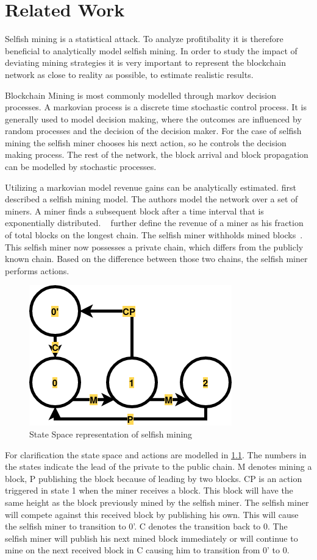 \chapter{Related Work}\label{chap:relatedwork}

Selfish mining is a statistical attack. To analyze profitibality it is therefore beneficial to analytically model selfish mining. In order to study the impact of deviating mining strategies it is very important to represent the blockchain network as close to reality as possible, to estimate realistic results.

Blockchain Mining is most commonly modelled through markov decision processes.
A markovian process is a discrete time stochastic control process. It is generally used to model decision making, where the outcomes are influenced by random processes and the decision of the decision maker.
For the case of selfish mining the selfish miner chooses his next action, so he controls the decision making process. The rest of the network, the block arrival and block propagation can be modelled by stochastic processes. 

Utilizing a markovian model revenue gains can be analytically estimated. \citeauthor{eyal} first described a selfish mining model.
The authors model the network over a set of miners. A miner finds a subsequent block after a time interval that is exponentially distributed. ~\citeauthor{eyal} further define the revenue of a miner as his fraction of total blocks on the longest chain.
The selfish miner withholds mined blocks~\cite{eyal}. This selfish miner now possesses a private chain, which differs from the publicly known chain. Based on the difference between those two chains, the selfish miner performs actions. 
\begin{figure}
\centering
\includegraphics[width=.5\linewidth]{figures/eyal_states.png}
\caption{State Space representation of selfish mining}
\label{fig:eyal_states}
\end{figure}
For clarification the state space and actions are modelled in \ref{fig:eyal_states}. The numbers in the states indicate the lead of the private to the public chain. M denotes mining a block, P publishing the block because of leading by two blocks. CP is an action triggered in state 1 when the miner receives a block. This block will have the same height as the block previously mined by the selfish miner. The selfish miner will compete against this received block by publishing his own. This will cause the selfish miner to transition to 0'. C denotes the transition back to 0. The selfish miner will publish his next mined block immediately or will continue to mine on the next received block in C causing him to transition from 0' to 0.

